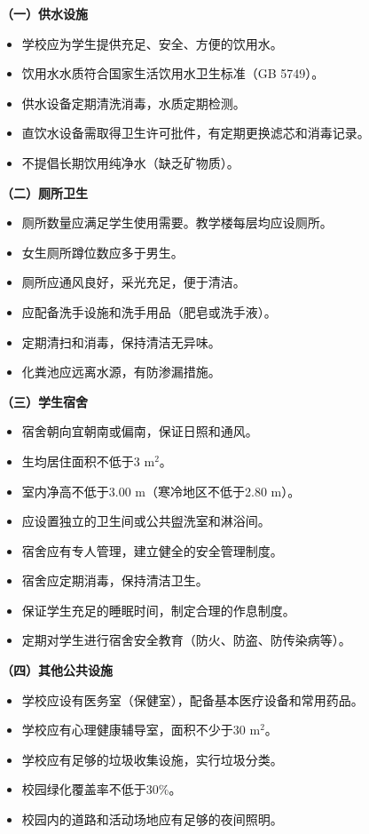 \begin{keybox}
\textbf{（一）供水设施}

\begin{itemize}[leftmargin=*]
    \item 学校应为学生提供充足、安全、方便的饮用水。
    \item 饮用水水质符合国家生活饮用水卫生标准（GB 5749）。
    \item 供水设备定期清洗消毒，水质定期检测。
    \item 直饮水设备需取得卫生许可批件，有定期更换滤芯和消毒记录。
    \item 不提倡长期饮用纯净水（缺乏矿物质）。
\end{itemize}

\textbf{（二）厕所卫生}

\begin{itemize}[leftmargin=*]
    \item 厕所数量应满足学生使用需要。教学楼每层均应设厕所。
    \item 女生厕所蹲位数应多于男生。
    \item 厕所应通风良好，采光充足，便于清洁。
    \item 应配备洗手设施和洗手用品（肥皂或洗手液）。
    \item 定期清扫和消毒，保持清洁无异味。
    \item 化粪池应远离水源，有防渗漏措施。
\end{itemize}

\textbf{（三）学生宿舍}

\begin{itemize}[leftmargin=*]
    \item 宿舍朝向宜朝南或偏南，保证日照和通风。
    \item 生均居住面积不低于3 $\mathrm{m}^2$。
    \item 室内净高不低于3.00 m（寒冷地区不低于2.80 m）。
    \item 应设置独立的卫生间或公共盥洗室和淋浴间。
    \item 宿舍应有专人管理，建立健全的安全管理制度。
    \item 宿舍应定期消毒，保持清洁卫生。
    \item 保证学生充足的睡眠时间，制定合理的作息制度。
    \item 定期对学生进行宿舍安全教育（防火、防盗、防传染病等）。
\end{itemize}

\textbf{（四）其他公共设施}

\begin{itemize}[leftmargin=*]
    \item 学校应设有医务室（保健室），配备基本医疗设备和常用药品。
    \item 学校应有心理健康辅导室，面积不少于30 $\mathrm{m}^2$。
    \item 学校应有足够的垃圾收集设施，实行垃圾分类。
    \item 校园绿化覆盖率不低于30\%。
    \item 校园内的道路和活动场地应有足够的夜间照明。
\end{itemize}
\end{keybox}

\newpage
